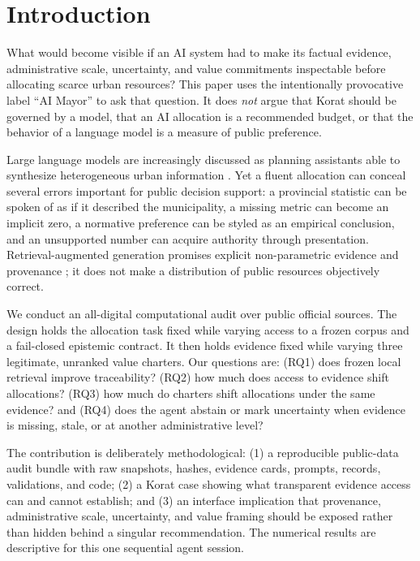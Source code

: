 \documentclass[sigconf,anonymous]{acmart}
\begin{document}
\section{Introduction}
What would become visible if an AI system had to make its factual evidence, administrative scale, uncertainty, and value commitments inspectable before allocating scarce urban resources? This paper uses the intentionally provocative label ``AI Mayor'' to ask that question. It does \emph{not} argue that Korat should be governed by a model, that an AI allocation is a recommended budget, or that the behavior of a language model is a measure of public preference.

Large language models are increasingly discussed as planning assistants able to synthesize heterogeneous urban information \cite{zheng2025urban,zhou2024participatory}. Yet a fluent allocation can conceal several errors important for public decision support: a provincial statistic can be spoken of as if it described the municipality, a missing metric can become an implicit zero, a normative preference can be styled as an empirical conclusion, and an unsupported number can acquire authority through presentation. Retrieval-augmented generation promises explicit non-parametric evidence and provenance \cite{lewis2020rag}; it does not make a distribution of public resources objectively correct.

We conduct an all-digital computational audit over public official sources. The design holds the allocation task fixed while varying access to a frozen corpus and a fail-closed epistemic contract. It then holds evidence fixed while varying three legitimate, unranked value charters. Our questions are: (RQ1) does frozen local retrieval improve traceability? (RQ2) how much does access to evidence shift allocations? (RQ3) how much do charters shift allocations under the same evidence? and (RQ4) does the agent abstain or mark uncertainty when evidence is missing, stale, or at another administrative level?

The contribution is deliberately methodological: (1) a reproducible public-data audit bundle with raw snapshots, hashes, evidence cards, prompts, records, validations, and code; (2) a Korat case showing what transparent evidence access can and cannot establish; and (3) an interface implication that provenance, administrative scale, uncertainty, and value framing should be exposed rather than hidden behind a singular recommendation. The numerical results are descriptive for this one sequential agent session.
\end{document}
